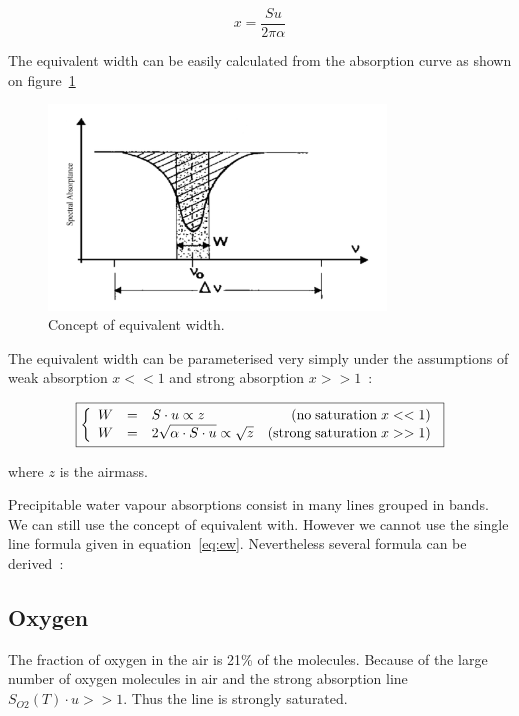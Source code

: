\documentclass[a4paper]{article}
\begin{document}
{\begin{equation}
 x=\frac{Su}{2\pi\alpha}
\end{equation}

The equivalent width can be easily calculated from the absorption curve as shown on figure~\ref{fig:ew}

\begin{figure}
\centering
\includegraphics[width=0.8\textwidth]{images/ew}
\caption{\label{fig:ew}Concept of equivalent width.}
\end{figure}


The equivalent width can be parameterised very simply under the assumptions of weak absorption $ x<<1$ and strong absorption $x>>1$~:

\begin{equation}
\fbox{$
\left\{
\begin{array}{ccl r}
W & = & S\cdot u  \propto z  & ({\rm no \; saturation\; }x<<1)\\
W & = & 2\sqrt{\alpha \cdot S\cdot u}  \propto \sqrt{z}  & ({\rm strong\;saturation\;} x>>1)\\
\end{array}
\right.
$}
\label{eq:ew}
\end{equation}

where $z$ is the airmass.


Precipitable water vapour absorptions consist in many lines grouped in bands. We can still use the concept of equivalent with. However we cannot use the single line
formula given in equation~\ref{eq:ew}.
Nevertheless several formula can be derived~:

\subsection{Oxygen}
The fraction of oxygen in the air is 21\% of the molecules. Because of the large number of oxygen molecules in air  and the strong absorption line $S_{O2}(T)\cdot u >>1$. Thus the line is strongly saturated.

}
\end{document}

